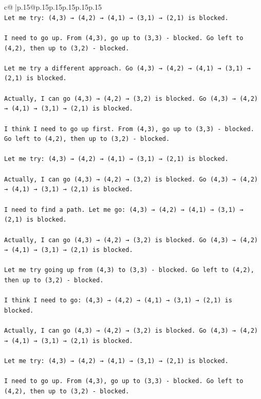 \documentclass{article}
\begin{document}
{\begin{supertabular}{c@{$\;$}|p{.15\linewidth}@{}p{.15\linewidth}p{.15\linewidth}p{.15\linewidth}p{.15\linewidth}p{.15\linewidth}}
{{{\\ 
\texttt{Let me try: (4,3) → (4,2) → (4,1) → (3,1) → (2,1) is blocked. } \\
\\ 
\texttt{I need to go up. From (4,3), go up to (3,3) {-} blocked. Go left to (4,2), then up to (3,2) {-} blocked. } \\
\\ 
\texttt{Let me try a different approach. Go (4,3) → (4,2) → (4,1) → (3,1) → (2,1) is blocked. } \\
\\ 
\texttt{Actually, I can go (4,3) → (4,2) → (3,2) is blocked. Go (4,3) → (4,2) → (4,1) → (3,1) → (2,1) is blocked.} \\
\\ 
\texttt{I think I need to go up first. From (4,3), go up to (3,3) {-} blocked. Go left to (4,2), then up to (3,2) {-} blocked. } \\
\\ 
\texttt{Let me try: (4,3) → (4,2) → (4,1) → (3,1) → (2,1) is blocked. } \\
\\ 
\texttt{Actually, I can go (4,3) → (4,2) → (3,2) is blocked. Go (4,3) → (4,2) → (4,1) → (3,1) → (2,1) is blocked.} \\
\\ 
\texttt{I need to find a path. Let me go: (4,3) → (4,2) → (4,1) → (3,1) → (2,1) is blocked. } \\
\\ 
\texttt{Actually, I can go (4,3) → (4,2) → (3,2) is blocked. Go (4,3) → (4,2) → (4,1) → (3,1) → (2,1) is blocked.} \\
\\ 
\texttt{Let me try going up from (4,3) to (3,3) {-} blocked. Go left to (4,2), then up to (3,2) {-} blocked. } \\
\\ 
\texttt{I think I need to go: (4,3) → (4,2) → (4,1) → (3,1) → (2,1) is blocked. } \\
\\ 
\texttt{Actually, I can go (4,3) → (4,2) → (3,2) is blocked. Go (4,3) → (4,2) → (4,1) → (3,1) → (2,1) is blocked.} \\
\\ 
\texttt{Let me try: (4,3) → (4,2) → (4,1) → (3,1) → (2,1) is blocked. } \\
\\ 
\texttt{I need to go up. From (4,3), go up to (3,3) {-} blocked. Go left to (4,2), then up to (3,2) {-} blocked. } \\
}}}
\end{supertabular}}
\end{document}

